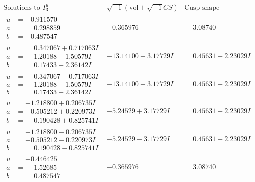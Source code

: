 \documentclass[1p]{elsarticle_modified}
\theoremstyle{definition}
\newcommand{\I}{\sqrt{-1}}
\begin{document}
$$\begin{array}{c|c|c}  
\text{Solutions to }I^u_{3}& \I (\text{vol} + \sqrt{-1}CS) & \text{Cusp shape}\\
 \hline 
\begin{aligned}
u &= -0.911570\phantom{ +0.000000I} \\
a &= \phantom{-}0.298859\phantom{ +0.000000I} \\
b &= -0.487547\phantom{ +0.000000I}\end{aligned}
 & -0.365976\phantom{ +0.000000I} & \phantom{-}3.08740\phantom{ +0.000000I} \\ \hline\begin{aligned}
u &= \phantom{-}0.347067 + 0.717063 I \\
a &= \phantom{-}1.20188 + 1.50579 I \\
b &= \phantom{-}0.17433 + 2.36142 I\end{aligned}
 & -13.14100 - 3.17729 I & \phantom{-}0.45631 + 2.23029 I \\ \hline\begin{aligned}
u &= \phantom{-}0.347067 - 0.717063 I \\
a &= \phantom{-}1.20188 - 1.50579 I \\
b &= \phantom{-}0.17433 - 2.36142 I\end{aligned}
 & -13.14100 + 3.17729 I & \phantom{-}0.45631 - 2.23029 I \\ \hline\begin{aligned}
u &= -1.218800 + 0.206735 I \\
a &= -0.505212 + 0.220973 I \\
b &= \phantom{-}0.190428 + 0.825741 I\end{aligned}
 & -5.24529 + 3.17729 I & \phantom{-}0.45631 - 2.23029 I \\ \hline\begin{aligned}
u &= -1.218800 - 0.206735 I \\
a &= -0.505212 - 0.220973 I \\
b &= \phantom{-}0.190428 - 0.825741 I\end{aligned}
 & -5.24529 - 3.17729 I & \phantom{-}0.45631 + 2.23029 I \\ \hline\begin{aligned}
u &= -0.446425\phantom{ +0.000000I} \\
a &= \phantom{-}1.52685\phantom{ +0.000000I} \\
b &= \phantom{-}0.487547\phantom{ +0.000000I}\end{aligned}
 & -0.365976\phantom{ +0.000000I} & \phantom{-}3.08740\phantom{ +0.000000I} \\ \hline\begin{aligned}

\end{aligned}
\end{array}$$
\end{document}
